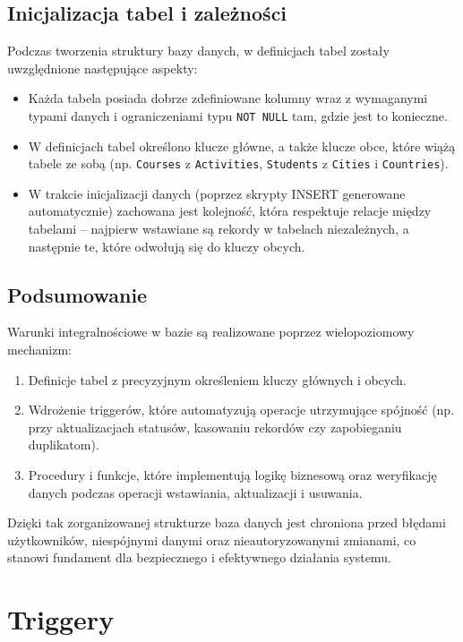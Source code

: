 \documentclass[12pt]{article}
\begin{document}
\subsection{Inicjalizacja tabel i zależności}
Podczas tworzenia struktury bazy danych, w definicjach tabel zostały uwzględnione następujące aspekty:
\begin{itemize}
    \item Każda tabela posiada dobrze zdefiniowane kolumny wraz z wymaganymi typami danych i ograniczeniami typu \texttt{NOT NULL} tam, gdzie jest to konieczne.
    \item W definicjach tabel określono klucze główne, a także klucze obce, które wiążą tabele ze sobą (np. \texttt{Courses} z \texttt{Activities}, \texttt{Students} z \texttt{Cities} i \texttt{Countries}).
    \item W trakcie inicjalizacji danych (poprzez skrypty INSERT generowane automatycznie) zachowana jest kolejność, która respektuje relacje między tabelami – najpierw wstawiane są rekordy w tabelach niezależnych, a następnie te, które odwołują się do kluczy obcych.
\end{itemize}

\subsection{Podsumowanie}
Warunki integralnościowe w bazie są realizowane poprzez wielopoziomowy mechanizm:
\begin{enumerate}
    \item Definicje tabel z precyzyjnym określeniem kluczy głównych i obcych.
    \item Wdrożenie triggerów, które automatyzują operacje utrzymujące spójność (np. przy aktualizacjach statusów, kasowaniu rekordów czy zapobieganiu duplikatom).
    \item Procedury i funkcje, które implementują logikę biznesową oraz weryfikację danych podczas operacji wstawiania, aktualizacji i usuwania.
\end{enumerate}
Dzięki tak zorganizowanej strukturze baza danych jest chroniona przed błędami użytkowników, niespójnymi danymi oraz nieautoryzowanymi zmianami, co stanowi fundament dla bezpiecznego i efektywnego działania systemu.



\newpage
\section{Triggery}
\label{sec:triggery}
\end{document}

